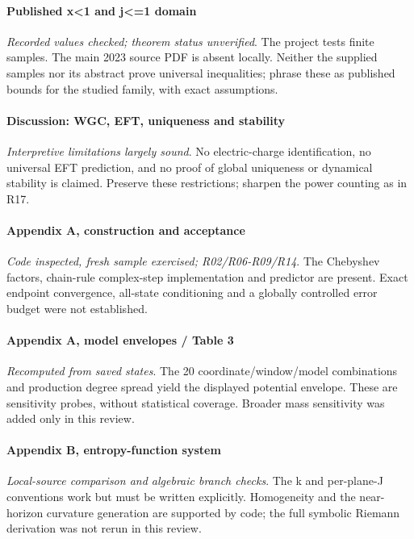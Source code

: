 \documentclass[10pt,a4paper]{article}
\begin{document}
\paragraph{Published x\textless{}1 and j\textless{}=1 domain} \textit{Recorded values checked; theorem status unverified}. The project tests finite samples. The main 2023 source PDF is absent locally. Neither the supplied samples nor its abstract prove universal inequalities; phrase these as published bounds for the studied family, with exact assumptions.

\paragraph{Discussion: WGC, EFT, uniqueness and stability} \textit{Interpretive limitations largely sound}. No electric-charge identification, no universal EFT prediction, and no proof of global uniqueness or dynamical stability is claimed. Preserve these restrictions; sharpen the power counting as in R17.

\paragraph{Appendix A, construction and acceptance} \textit{Code inspected, fresh sample exercised; R02/R06-R09/R14}. The Chebyshev factors, chain-rule complex-step implementation and predictor are present. Exact endpoint convergence, all-state conditioning and a globally controlled error budget were not established.

\paragraph{Appendix A, model envelopes / Table 3} \textit{Recomputed from saved states}. The 20 coordinate/window/model combinations and production degree spread yield the displayed potential envelope. These are sensitivity probes, without statistical coverage. Broader mass sensitivity was added only in this review.

\paragraph{Appendix B, entropy-function system} \textit{Local-source comparison and algebraic branch checks}. The k and per-plane-J conventions work but must be written explicitly. Homogeneity and the near-horizon curvature generation are supported by code; the full symbolic Riemann derivation was not rerun in this review.
\end{document}
